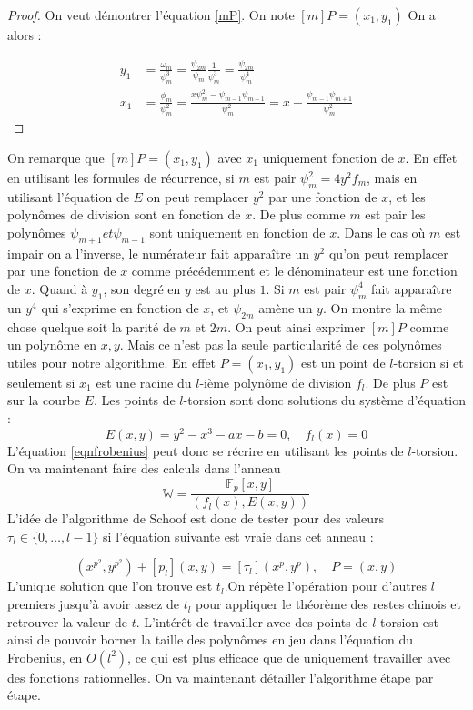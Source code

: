 \documentclass[12pt]{article}
\begin{document}
\begin{proof}
On veut démontrer l'équation \ref{mP}. 
\newline
On note $[m]P = (x_1, y_1)$ 
On a alors : 

\begin{align*}
y_1 &= \frac{\omega_m}{\psi^3_m} = \frac{\psi_{2m}}{\psi_m} \frac{1}{\psi_m^3} = \frac{\psi_{2m}}{\psi_m^4} \\
x_1 &= \frac{\phi_m}{\psi^2_m} =  \frac{x \psi^2_m - \psi_{m-1}\psi_{m+1}}{\psi_m^2} = x - \frac{\psi_{m-1}\psi_{m+1}}{\psi_m^2}	
\end{align*}




\end{proof}
On remarque que $[m]P = (x_1, y_1)$ avec $x_1$ uniquement fonction de $x$. En effet en utilisant les formules de récurrence, si $m$ est pair $\psi_m^2 = 4y^2f_m$, mais en utilisant l'équation de $E$ on peut remplacer $y^2$ par une fonction de $x$, et les polynômes de division sont en fonction de $x$. De plus comme $m$ est pair les polynômes $\psi_{m+1} et \psi_{m-1}$ sont uniquement en fonction de $x$. Dans le cas où $m$ est impair on a l'inverse, le numérateur fait apparaître un $y^2$ qu'on peut remplacer par une fonction de $x$ comme précédemment et le dénominateur est une fonction de $x$. Quand à $y_1$, son degré en $y$ est au plus $1$. Si $m$ est pair $\psi_m^4$ fait apparaître un $y^4$ qui s'exprime en fonction de $x$, et $\psi_{2m}$ amène un $y$. On montre la même chose quelque soit la parité de $m$ et $2m$.
On peut ainsi exprimer $[m]P$ comme un polynôme en $x,y$. Mais ce n'est pas la seule particularité de ces polynômes utiles pour notre algorithme. En effet $P = (x_1, y_1)$ est un point de $l$-torsion si et seulement si $x_1$ est une racine du $l$-ième polynôme de division $f_l$. De plus $P$ est sur la courbe $E$. Les points de $l$-torsion sont donc solutions du système d'équation : 
\begin{equation}
E(x,y) = y^2 - x^3 - ax - b = 0, \quad f_l(x) = 0
\end{equation}
L'équation \ref{eqnfrobenius} peut donc se récrire en utilisant les points de $l$-torsion. On va maintenant faire des calculs dans l'anneau
$$\mathbb{W}= \frac{\mathbb{F}_p[x,y]}{(f_l(x), E(x,y))}$$
L'idée de l'algorithme de Schoof est donc de tester pour des valeurs $\tau_l \in \lbrace 0, \ldots, l-1 \rbrace$ si l'équation suivante est vraie dans cet anneau :

\begin{equation}
(x^{p^2}, y^{p^2}) + [p_l](x,y) = [\tau_l](x^{p}, y^{p}),  \quad P=(x,y)
\end{equation}
L'unique solution que l'on trouve est $t_l$.On répète l'opération pour d'autres $l$ premiers jusqu'à avoir assez de $t_l$ pour appliquer le théorème des restes chinois et retrouver la valeur de $t$. L'intérêt de travailler avec des points de $l$-torsion est ainsi de pouvoir borner la taille des polynômes en jeu dans l'équation du Frobenius, en $O(l^2)$, ce qui est plus efficace que de uniquement travailler avec des fonctions rationnelles.
\newline
\medskip
On va maintenant détailler l'algorithme étape par étape. 
\end{document}
